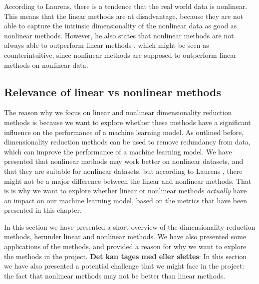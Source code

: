 According to Laurens, there is a tendence that the real world data is nonlinear. This means that the linear methods are at disadvantage, because they are not able to capture the intrinsic dimensionality of the nonlinear data as good as nonlinear methods. However, he also states that nonlinear methods are not always able to outperform linear methods \cite{dimensionality-reduction-comparative-review}, which might be seen as counterintuitive, since nonlinear methods are supposed to outperform linear methods on nonlinear data.

\subsection{Relevance of linear vs nonlinear methods}
The reason why we focus on linear and nonlinear dimensionality reduction methods is because we want to explore whether these methods have a significant influence on the performance of a machine learning model. As outlined before, dimensionality reduction methods can be used to remove redundancy from data, which can improve the performance of a machine learning model. We have presented that nonlinear methods may work better on nonlinear datasets, and that they are suitable for nonlinear datasets, but according to Laurens \cite{dimensionality-reduction-comparative-review}, there might not be a major difference between the linear and nonlinear methods. That is is why we want to explore whether linear or nonlinear methods \textit{actually} have an impact on our machine learning model, based on the metrics that have been presented in this chapter.


In this section we have presented a short overview of the dimensionality reduction methods, herunder linear and nonlinear methods. We have also presented some applications of the methods, and provided a reason for why we want to explore the methods in the project. \textbf{Det kan tages med eller slettes}: In this section we have also presented a potential challenge that we might face in the project: the fact that nonlinear methods may not be better than linear methods.


